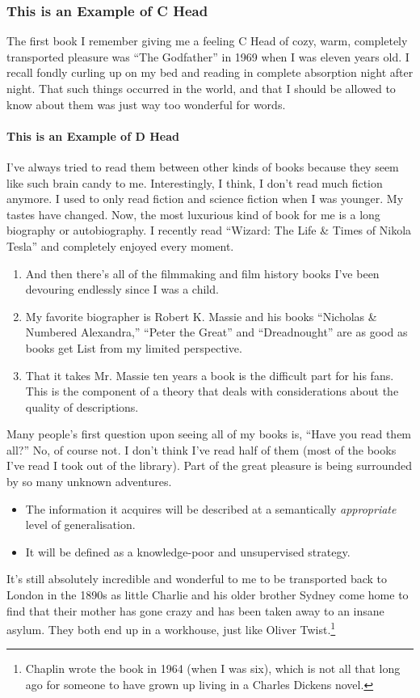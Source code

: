 \documentclass[manuscript]{clv2025}
\begin{document}
\subsubsection{This is an Example of C Head}

The first book I remember giving me a feeling C Head of cozy, warm, completely transported pleasure was ``The Godfather'' in 1969 when I was eleven years old. I recall fondly curling up on my bed and reading in complete absorption night after night. That such things occurred in the world, and that I should be allowed to know about them was just way too wonderful for words.

\paragraph{This is an Example of D Head}

I've always tried to read them between other kinds of books because they seem like such brain candy to me. Interestingly, I think, I don't read much fiction anymore. I used to only read fiction and science fiction when I was younger. My tastes have changed. Now, the most luxurious kind of book for me is a long biography or autobiography. I recently read ``Wizard: The Life \& Times of Nikola Tesla'' and completely enjoyed every moment.
\begin{enumerate}
\item And then there's all of the filmmaking and film history books I've been devouring endlessly since I was a child.
\item My favorite biographer is Robert K. Massie and his books ``Nicholas \& Numbered Alexandra,'' ``Peter the Great'' and ``Dreadnought'' are as good as books get List from my limited perspective.
\item That it takes Mr. Massie ten years a book is the difficult part for his fans. This is the component of a theory that deals with considerations about the quality of descriptions.
\end{enumerate}
Many people's first question upon seeing all of my books is, ``Have you read them all?'' No, of course not. I don't think I've read half of them (most of the books I've read I took out of the library). Part of the great pleasure is being surrounded by so many unknown adventures.

\begin{itemize}
\item The information it acquires will be described at a semantically {\em appropriate} level of generalisation.
\item It will be defined as a knowledge-poor and unsupervised strategy.
\end{itemize}
It's still absolutely incredible and wonderful to me to be transported back to London in the 1890s as little Charlie and his older brother Sydney come home to find that their mother has gone crazy and has been taken away to an insane asylum. They both end up in a workhouse, just like Oliver Twist.\footnote{Chaplin wrote the book in 1964 (when I was six), which is not all that long ago for someone to have grown up living in a Charles Dickens novel.}
\end{document}
